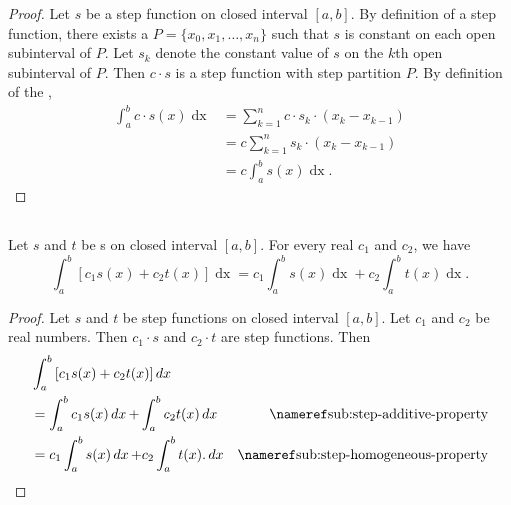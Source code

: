 \documentclass{report}
\begin{document}
\begin{proof}

  Let $s$ be a step function on closed interval $[a, b]$.
  By definition of a step function, there exists a 
    $P = \{x_0, x_1, \ldots, x_n\}$ such that $s$ is constant on each open
    subinterval of $P$.
  Let $s_k$ denote the constant value of $s$ on the $k$th open subinterval of
    $P$.
  Then $c \cdot s$ is a step function with step partition $P$.
  By definition of the ,
    \begin{align*}
      \int_a^b c \cdot s(x) \mathop{dx}
        & = \sum_{k=1}^n c \cdot s_k \cdot (x_k - x_{k-1}) \\
        & = c \sum_{k=1}^n s_k \cdot (x_k - x_{k-1}) \\
        & = c \int_a^b s(x) \mathop{dx}.
    \end{align*}

\end{proof}

\subsection{}%
\label{sub:step-linearity-property}
\label{sub:theorem-1.4}

\begin{theorem}[1.4]

  Let $s$ and $t$ be s on closed interval
    $[a, b]$.
  For every real $c_1$ and $c_2$, we have
    $$\int_a^b \left[ c_1s(x) + c_2t(x) \right] \mathop{dx} =
      c_1\int_a^b s(x) \mathop{dx} + c_2\int_a^b t(x) \mathop{dx}.$$

\end{theorem}

\begin{proof}

  Let $s$ and $t$ be step functions on closed interval $[a, b]$.
  Let $c_1$ and $c_2$ be real numbers.
  Then $c_1 \cdot s$ and $c_2 \cdot t$ are step functions.
  Then
    \begin{align*}
      & \int_a^b \left[ c_1s(x) + c_2t(x) \right] \mathop{dx} \\
      & = \int_a^b c_1s(x) \mathop{dx} + \int_a^b c_2t(x) \mathop{dx}
        & \textref{sub:step-additive-property} \\
      & = c_1\int_a^b s(x) \mathop{dx} + c_2\int_a^b t(x). \mathop{dx}
        & \textref{sub:step-homogeneous-property}
    \end{align*}

\end{proof}
\end{document}
